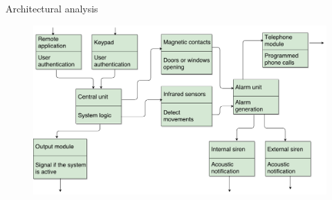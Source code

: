 \begin{frame}{Architectural analysis}

  \begin{figure}[ht!]
    \centering
    \includegraphics[width=120mm]{images/architectural_analysis.pdf}
    \label{fig:architectural_analysis}
  \end{figure}

\end{frame}
